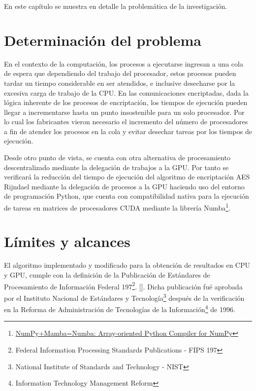 \documentclass[../main/main.tex]{subfiles}
\begin{document}
\espacio

  En este capítulo se muestra en detalle la problemática de la investigación.

  \section{Determinación del problema}

  En el contexto de la computación, los procesos a ejecutarse ingresan a una cola de espera que dependiendo del trabajo del procesador, estos procesos pueden tardar un tiempo considerable en ser atendidos, e inclusive desecharse por la excesiva carga de trabajo de la CPU. En las comunicaciones encriptadas, dada la lógica inherente de los procesos de encriptación, los tiempos de ejecución pueden llegar a incrementarse hasta un punto insostenible para un solo procesador. Por lo cual los fabricantes vieron necesario el incremento del número de procesadores a fin de atender los procesos en la cola y evitar desechar tareas por los tiempos de ejecución.

  Desde otro punto de vista, se cuenta con otra alternativa de procesamiento descentralizado mediante la delegación de trabajos a la GPU. Por tanto se verificará la reducción del tiempo de ejecución del algoritmo de encriptación AES Rijndael mediante la delegación de procesos a la GPU haciendo uso del entorno de programación Python, que cuenta con compatibilidad nativa para la ejecución de tareas en matrices de procesadores CUDA mediante la librería Numba\footnote{\href{http://numba.pydata.org/numba-doc/latest/cuda/index.html}{NumPy+Mamba=Numba: Array-oriented Python Compiler for NumPy}}.

  \section{Límites y alcances}

  El algoritmo implementado y modificado para la obtención de resultados en CPU y GPU, cumple con la definición de la Publicación de Estándares de Procesamiento de Información Federal 197\footnote{Federal Information Processing Standards Publications - FIPS 197}. [\cite{report:FIPS_197}]. Dicha publicación fué aprobada por el Instituto Nacional de Estándares y Tecnología\footnote{National Institute of Standards and Technology - NIST} después de la verificación en la Reforma de Administración de Tecnologías de la Información\footnote{Information Technology Management Reform} de 1996.
\end{document}
